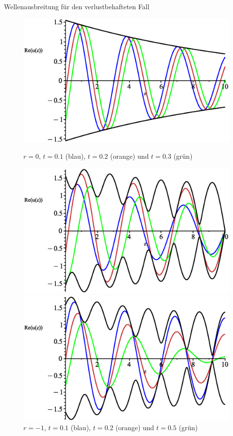 \documentclass{beamer}
\begin{document}
\begin{frame}{Wellenausbreitung für den verlustbehafteten Fall}
    \begin{figure}[H]
    \begin{minipage}{0.32\textwidth}
        \centering
        \includegraphics[width=\linewidth]{../graphics/Enveloppe/verlustbehaftet/R0}
        \caption*{$r=0$, $t=0.1$ (blau), $t=0.2$ (orange) und $t=0.3$ (grün)}
    \end{minipage}
    \hfill
    \begin{minipage}{0.32\textwidth}
        \centering
        \includegraphics[width=\linewidth]{../graphics/Enveloppe/verlustbehaftet/R-1}
        \caption*{$r=-1$, $t=0.1$ (blau), $t=0.2$ (orange) und $t=0.5$ (grün)}
    \end{minipage}
    \hfill
    \begin{minipage}{0.32\textwidth}
        \centering
        \includegraphics[width=\linewidth]{../graphics/Enveloppe/verlustbehaftet/R1}

\end{minipage}
\end{figure}
\end{frame}
\end{document}

